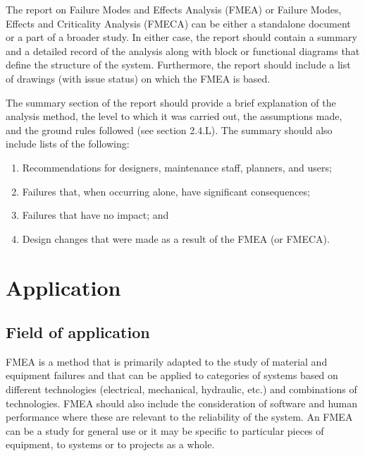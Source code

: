 \documentclass[./dissertation.tex]{subfiles}
\begin{document}
The report on Failure Modes and Effects Analysis (FMEA) or Failure Modes, Effects and Criticality Analysis (FMECA) can be either a standalone document or a part of a broader study. In either case, the report should contain a summary and a detailed record of the analysis along with block or functional diagrams that define the structure of the system. Furthermore, the report should include a list of drawings (with issue status) on which the FMEA is based.

The summary section of the report should provide a brief explanation of the analysis method, the level to which it was carried out, the assumptions made, and the ground rules followed (see section 2.4.L). The summary should also include lists of the following:

\begin{enumerate}
\item Recommendations for designers, maintenance staff, planners, and users;
\item Failures that, when occurring alone, have significant consequences;
\item Failures that have no impact; and
\item Design changes that were made as a result of the FMEA (or FMECA).
\end{enumerate}



\section{Application}
\subsection{Field of application}
FMEA is a method that is primarily adapted to the study of material and equipment failures and that can be applied to categories of systems based on different technologies (electrical, mechanical, hydraulic, etc.) and combinations of technologies. FMEA should also include the consideration of software and human performance where these are relevant to the reliability of the system. An FMEA can be a study for general use or it may be specific to particular pieces of equipment, to systems or to projects as a whole.
\end{document}
